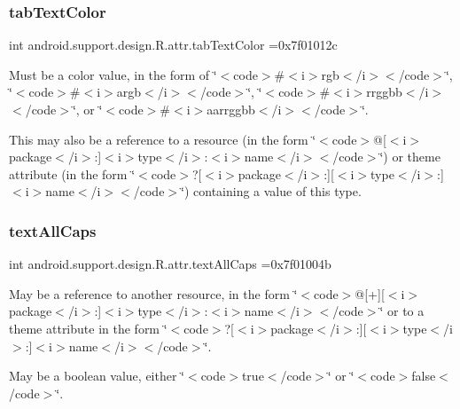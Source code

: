\subsubsection{\texorpdfstring{tab\+Text\+Color}{tabTextColor}}
{\footnotesize\ttfamily int android.\+support.\+design.\+R.\+attr.\+tab\+Text\+Color =0x7f01012c\hspace{0.3cm}{\ttfamily [static]}}

Must be a color value, in the form of \char`\"{}$<$code$>$\#$<$i$>$rgb$<$/i$>$$<$/code$>$\char`\"{}, \char`\"{}$<$code$>$\#$<$i$>$argb$<$/i$>$$<$/code$>$\char`\"{}, \char`\"{}$<$code$>$\#$<$i$>$rrggbb$<$/i$>$$<$/code$>$\char`\"{}, or \char`\"{}$<$code$>$\#$<$i$>$aarrggbb$<$/i$>$$<$/code$>$\char`\"{}. 

This may also be a reference to a resource (in the form \char`\"{}$<$code$>$@\mbox{[}$<$i$>$package$<$/i$>$\+:\mbox{]}$<$i$>$type$<$/i$>$\+:$<$i$>$name$<$/i$>$$<$/code$>$\char`\"{}) or theme attribute (in the form \char`\"{}$<$code$>$?\mbox{[}$<$i$>$package$<$/i$>$\+:\mbox{]}\mbox{[}$<$i$>$type$<$/i$>$\+:\mbox{]}$<$i$>$name$<$/i$>$$<$/code$>$\char`\"{}) containing a value of this type. \mbox{\label{classandroid_1_1support_1_1design_1_1R_1_1attr_ab79e12973dd7b26f7ad9ef87ae44ecfa}} 
\subsubsection{\texorpdfstring{text\+All\+Caps}{textAllCaps}}
{\footnotesize\ttfamily int android.\+support.\+design.\+R.\+attr.\+text\+All\+Caps =0x7f01004b\hspace{0.3cm}{\ttfamily [static]}}

May be a reference to another resource, in the form \char`\"{}$<$code$>$@\mbox{[}+\mbox{]}\mbox{[}$<$i$>$package$<$/i$>$\+:\mbox{]}$<$i$>$type$<$/i$>$\+:$<$i$>$name$<$/i$>$$<$/code$>$\char`\"{} or to a theme attribute in the form \char`\"{}$<$code$>$?\mbox{[}$<$i$>$package$<$/i$>$\+:\mbox{]}\mbox{[}$<$i$>$type$<$/i$>$\+:\mbox{]}$<$i$>$name$<$/i$>$$<$/code$>$\char`\"{}. 

May be a boolean value, either \char`\"{}$<$code$>$true$<$/code$>$\char`\"{} or \char`\"{}$<$code$>$false$<$/code$>$\char`\"{}. \mbox{\label{classandroid_1_1support_1_1design_1_1R_1_1attr_aa64eaeed4304e517cca3d5dba09f339e}} 
